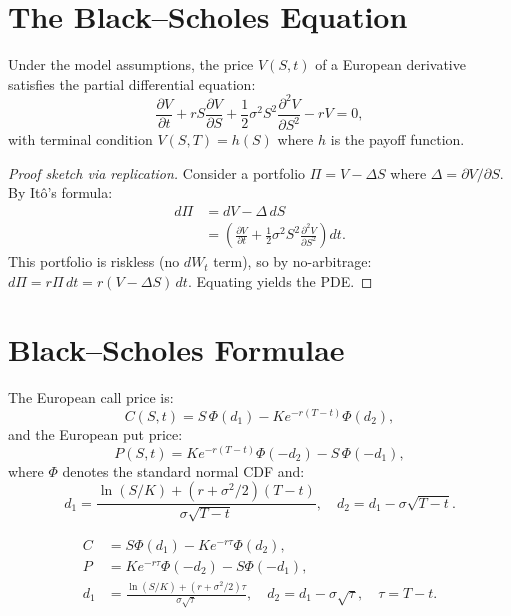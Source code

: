 \section{The Black--Scholes Equation}

\begin{theorem}
\label{thm:bs_pde}
Under the model assumptions, the price $V(S,t)$ of a European derivative
satisfies the partial differential equation:
\[
    \frac{\partial V}{\partial t} + rS\frac{\partial V}{\partial S}
    + \frac{1}{2}\sigma^2 S^2 \frac{\partial^2 V}{\partial S^2} - rV = 0,
\]
with terminal condition $V(S,T) = h(S)$ where $h$ is the payoff function.
\end{theorem}

\begin{proof}[Proof sketch via replication]
Consider a portfolio $\Pi = V - \Delta S$ where $\Delta = \partial V/\partial S$.
By It\^o's formula:
\begin{align*}
    d\Pi &= dV - \Delta \, dS \\
         &= \left(\frac{\partial V}{\partial t}
            + \frac{1}{2}\sigma^2 S^2 \frac{\partial^2 V}{\partial S^2}\right)dt.
\end{align*}
This portfolio is riskless (no $dW_t$ term), so by no-arbitrage:
$d\Pi = r\Pi\,dt = r(V - \Delta S)\,dt$.
Equating yields the PDE.
\end{proof}

\section{Black--Scholes Formulae}

\begin{theorem}
\label{thm:bs_formulae}
The European call price is:
\[
    C(S,t) = S\,\Phi(d_1) - Ke^{-r(T-t)}\Phi(d_2),
\]
and the European put price:
\[
    P(S,t) = Ke^{-r(T-t)}\Phi(-d_2) - S\,\Phi(-d_1),
\]
where $\Phi$ denotes the standard normal CDF and:
\[
    d_1 = \frac{\ln(S/K) + (r + \sigma^2/2)(T-t)}{\sigma\sqrt{T-t}}, \quad
    d_2 = d_1 - \sigma\sqrt{T-t}.
\]
\end{theorem}

\begin{keyformulas}[title=\textbf{Black--Scholes Formulae --- Summary}]
\begin{align*}
    C &= S\Phi(d_1) - Ke^{-r\tau}\Phi(d_2), \\
    P &= Ke^{-r\tau}\Phi(-d_2) - S\Phi(-d_1), \\
    d_1 &= \frac{\ln(S/K) + (r + \sigma^2/2)\tau}{\sigma\sqrt{\tau}}, \quad
    d_2 = d_1 - \sigma\sqrt{\tau}, \quad \tau = T - t.
\end{align*}
\end{keyformulas}

